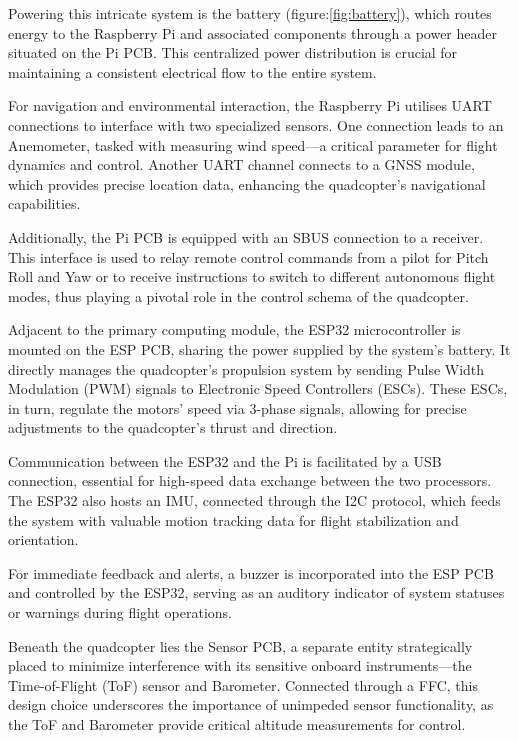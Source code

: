 \documentclass{article}
\begin{document}
Powering this intricate system is the battery (figure:\ref{fig:battery}), which routes energy to the Raspberry Pi and associated components through a power header situated on the Pi PCB. This centralized power distribution is crucial for maintaining a consistent electrical flow to the entire system.

For navigation and environmental interaction, the Raspberry Pi utilises UART connections to interface with two specialized sensors. One connection leads to an Anemometer, tasked with measuring wind speed—a critical parameter for flight dynamics and control. Another UART channel connects to a GNSS module, which provides precise location data, enhancing the quadcopter's navigational capabilities.

Additionally, the Pi PCB is equipped with an SBUS connection to a receiver. This interface is used to relay remote control commands from a pilot for Pitch Roll and Yaw or to receive instructions to switch to different autonomous flight modes, thus playing a pivotal role in the control schema of the quadcopter.

Adjacent to the primary computing module, the ESP32 microcontroller is mounted on the ESP PCB, sharing the power supplied by the system's battery. It directly manages the quadcopter's propulsion system by sending Pulse Width Modulation (PWM) signals to Electronic Speed Controllers (ESCs). These ESCs, in turn, regulate the motors' speed via 3-phase signals, allowing for precise adjustments to the quadcopter's thrust and direction.

Communication between the ESP32 and the Pi is facilitated by a USB connection, essential for high-speed data exchange between the two processors. The ESP32 also hosts an IMU, connected through the I2C protocol, which feeds the system with valuable motion tracking data for flight stabilization and orientation.

For immediate feedback and alerts, a buzzer is incorporated into the ESP PCB and controlled by the ESP32, serving as an auditory indicator of system statuses or warnings during flight operations.

Beneath the quadcopter lies the Sensor PCB, a separate entity strategically placed to minimize interference with its sensitive onboard instruments—the Time-of-Flight (ToF) sensor and Barometer. Connected through a FFC, this design choice underscores the importance of unimpeded sensor functionality, as the ToF and Barometer provide critical altitude measurements for control.
\end{document}
